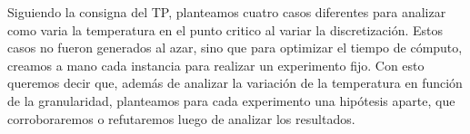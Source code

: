 Siguiendo la consigna del TP, planteamos cuatro casos diferentes para analizar como varia la temperatura 
en el punto critico al variar la discretización. Estos casos no fueron
generados al azar, sino que para optimizar el tiempo de cómputo, creamos a mano cada instancia para 
realizar un experimento fijo. Con esto queremos decir que, además de 
analizar la variación de la temperatura en función de la granularidad, planteamos para cada experimento 
una hipótesis aparte, que corroboraremos o 
refutaremos luego de analizar los resultados.


